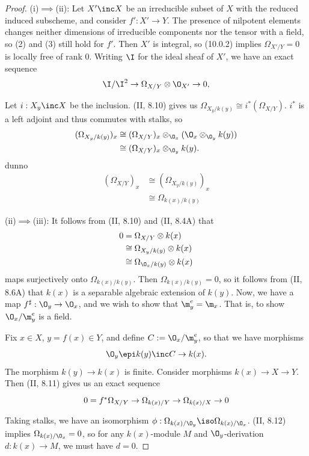\documentclass[12pt]{amsart}
\begin{document}
\begin{proof}
  (i)$\implies$(ii):
  Let $X'\inc X$ be an irreducible subset of $X$ with the reduced induced subscheme, and consider $f':X'\to Y$.
  The presence of nilpotent elements changes neither dimensions of irreducible components nor the tensor with a field, so (2) and (3) still hold for $f'$.
  Then $X'$ is integral, so (10.0.2) implies $\Omega_{X'/Y}=0$ is locally free of rank 0.
  Writing $\I$ for the ideal sheaf of $X'$, we have an exact sequence
  \[
    \I/\I^2\to \Omega_{X/Y}\otimes \O_{X'}\to 0,
  \] 

  Let $i:X_y\inc X$ be the inclusion.
  (II, 8.10) gives us $\Omega_{X_y/k(y)}\cong i^*(\Omega_{X/Y})$.
  $i^*$ is a left adjoint and thus commutes with stalks, so
  \begin{align*}
    (\Omega_{X_y/k(y)})_x 
      &\cong (\Omega_{X/Y})_x\otimes_{\O_x} (\O_x\otimes_{\O_y} k(y)) \\
      &\cong (\Omega_{X/Y})_x\otimes_{\O_y}k(y).
  \end{align*}
  dunno
  \begin{align*}
    (\Omega_{X/Y})_x
      &\cong (\Omega_{X_y/k(y)})_x \\
      &\cong \Omega_{k(x)/k(y)}
  \end{align*}

  (ii)$\implies$(iii):
  It follows from (II, 8.10) and (II, 8.4A) that
  \begin{align*}
    0 &= \Omega_{X/Y}\otimes k(x) \\
      &\cong \Omega_{X_y/k(y)}\otimes k(x) \\
      &\cong \Omega_{\O_x/k(y)}\otimes k(x)
  \end{align*}
  maps surjectively onto $\Omega_{k(x)/k(y)}$.
  Then $\Omega_{k(x)/k(y)}=0$, so it follows from (II, 8.6A) that $k(x)$ is a separable algebraic extension of $k(y)$.
  Now, we have a map $f^\sharp:\O_y\to \O_x$, and we wish to show that $\m_y^e = \m_x$.
  That is, to show $\O_x/\m_y^e$ is a field.
  
  Fix $x\in X$, $y=f(x)\in Y$, and define $C:= \O_x/\m_y^e$, so that we have morphisms
  \begin{align*}
    \O_y\epi k(y)\inc C\to k(x).
  \end{align*}
  The morphism $k(y)\to k(x)$ is finite.
  Consider morphisms $k(x)\to X\to Y$.
  Then (II, 8.11) gives us an exact sequence
  \[
    \begin{tikzcd}
      0=f^*\Omega_{X/Y}\to \Omega_{k(x)/Y}\to \Omega_{k(x)/X}\to 0
    \end{tikzcd}
  \] 
  Taking stalks, we have an isomorphism $\phi:\Omega_{k(x)/\O_y}\iso \Omega_{k(x)/\O_x}$.
  (II, 8.12) implies $\Omega_{k(x)/\O_x}=0$, so for any $k(x)$-module $M$ and $\O_y$-derivation $d:k(x)\to M$, we must have $d=0$.


\end{proof}
\end{document}
